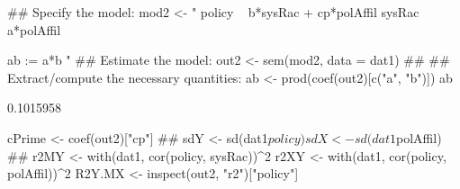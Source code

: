 \begin{Schunk}
\begin{Sinput}
 ## Specify the model:
 mod2 <- "
 policy ~ b*sysRac + cp*polAffil
 sysRac ~ a*polAffil
 
 ab := a*b
 "
 ## Estimate the model:
 out2 <- sem(mod2, data = dat1)
 ##
 ## Extract/compute the necessary quantities:
 ab <- prod(coef(out2)[c("a", "b")])
 ab
\end{Sinput}
\begin{Soutput}
[1] 0.1015958
\end{Soutput}
\begin{Sinput}
 cPrime <- coef(out2)["cp"]
 ##
 sdY <- sd(dat1$policy)
 sdX <- sd(dat1$polAffil)
 ##
 r2MY <- with(dat1, cor(policy, sysRac))^2
 r2XY <- with(dat1, cor(policy, polAffil))^2
 R2Y.MX <- inspect(out2, "r2")["policy"]
\end{Sinput}
\end{Schunk}
